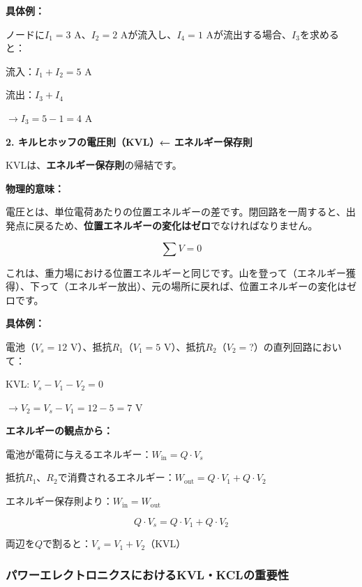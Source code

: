 \textbf{具体例：}

ノードに$I_1=3$ A、$I_2=2$ Aが流入し、$I_4=1$ Aが流出する場合、$I_3$を求めると：

流入：$I_1 + I_2 = 5$ A

流出：$I_3 + I_4$

$\rightarrow I_3 = 5 - 1 = 4$ A

\textbf{2. キルヒホッフの電圧則（KVL）← エネルギー保存則}

KVLは、\textbf{エネルギー保存則}の帰結です。

\begin{screen}
\textbf{物理的意味：}

電圧とは、単位電荷あたりの位置エネルギーの差です。閉回路を一周すると、出発点に戻るため、\textbf{位置エネルギーの変化はゼロ}でなければなりません。

\begin{equation}
\sum V = 0
\end{equation}

これは、重力場における位置エネルギーと同じです。山を登って（エネルギー獲得）、下って（エネルギー放出）、元の場所に戻れば、位置エネルギーの変化はゼロです。
\end{screen}

\textbf{具体例：}

電池（$V_s=12$ V）、抵抗$R_1$（$V_1=5$ V）、抵抗$R_2$（$V_2=$?）の直列回路において：

KVL: $V_s - V_1 - V_2 = 0$

$\rightarrow V_2 = V_s - V_1 = 12 - 5 = 7$ V

\begin{screen}
\textbf{エネルギーの観点から：}

電池が電荷に与えるエネルギー：$W_{\text{in}} = Q \cdot V_s$

抵抗$R_1$、$R_2$で消費されるエネルギー：$W_{\text{out}} = Q \cdot V_1 + Q \cdot V_2$

エネルギー保存則より：$W_{\text{in}} = W_{\text{out}}$

\begin{equation}
Q \cdot V_s = Q \cdot V_1 + Q \cdot V_2
\end{equation}

両辺を$Q$で割ると：$V_s = V_1 + V_2$（KVL）
\end{screen}

\subsubsection{パワーエレクトロニクスにおけるKVL・KCLの重要性}

